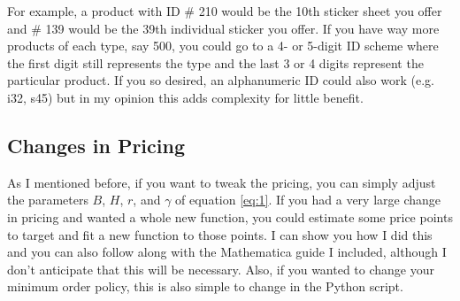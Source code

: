 \documentclass{article}
\begin{document}
For example, a product with ID \# 210 would be the 10th sticker sheet you offer and \# 139 would be the 39th individual sticker you offer. If you have way more products of each type, say 500, you could go to a 4- or 5-digit ID scheme where the first digit still represents the type and the last 3 or 4 digits represent the particular product.  If you so desired, an alphanumeric ID could also work (e.g. i32, s45) but in my opinion this adds complexity for little benefit.

\subsection{Changes in Pricing}
As I mentioned before, if you want to tweak the pricing, you can simply adjust the parameters $B$, $H$, $r$, and $\gamma$ of equation \ref{eq:1}. If you had a very large change in pricing and wanted a whole new function, you could estimate some price points to target and fit a new function to those points. I can show you how I did this and you can also follow along with the Mathematica guide I included, although I don't anticipate that this will be necessary. Also, if you wanted to change your minimum order policy, this is also simple to change in the Python script. 
\end{document}
